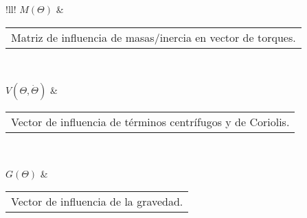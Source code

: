 \begin{table}[H]
\begin{tabular}{!{\color{AzulTable}\vrule}ll!{\color{AzulTable}\vrule}}
\textbf{$M\left( \Theta \right)$}		& \begin{tabular}[l]{@{}l@{}}Matriz de influencia de masas/inercia en vector de torques.\end{tabular}						\\ \hline


\textbf{$V\left( \Theta , \dot{\Theta} \right)$}		& \begin{tabular}[l]{@{}l@{}}Vector de influencia de términos centrífugos y de Coriolis.\end{tabular}						\\ \hline

\textbf{$G\left( \Theta \right)$}		& \begin{tabular}[l]{@{}l@{}}Vector de influencia de la gravedad.\end{tabular}						\\ \hline


\end{tabular}
\end{table}
%